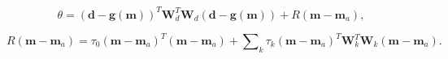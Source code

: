\[\theta  = {\left( {{\mathbf{d}} - {\mathbf{g(m)}}} \right)^T}{\mathbf{W}}_d^T{\mathbf{W}}_d^{}\left( {{\mathbf{d}} - {\mathbf{g(m)}}} \right) + R\left( {{\mathbf{m}} - {{\mathbf{m}}_a}} \right),\]%


\[R\left( {{\mathbf{m}} - {{\mathbf{m}}_a}} \right) = {\tau _0}{\left( {{\mathbf{m}} - {{\mathbf{m}}_a}} \right)^T}\left( {{\mathbf{m}} - {{\mathbf{m}}_a}} \right) + \sum\nolimits_k {{\tau _k}{{\left( {{\mathbf{m}} - {{\mathbf{m}}_a}} \right)}^T}{\mathbf{W}}_k^T{\mathbf{W}}_k^{}\left( {{\mathbf{m}} - {{\mathbf{m}}_a}} \right)} .\]%


